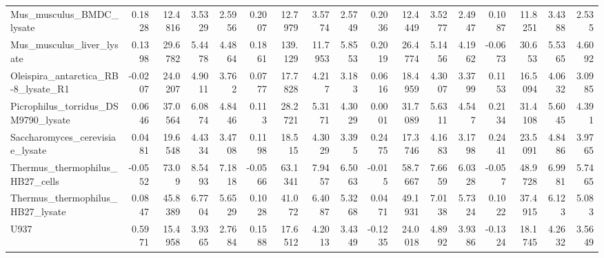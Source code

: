 \begin{tabular}{lrrrrrrrrrrrrrrrr}
 Mus\_musculus\_BMDC\_lysate                    &               0.1828  &          12.4816 &           3.5329  &          2.5956  &         0.2007   &     12.7979 &      3.5774  &     2.5749  &       0.2036   &   12.4449 &     3.5277 &   2.4947  &         0.1087   &     11.8251 &       3.4388 &     2.535   \\
 Mus\_musculus\_liver\_lysate                   &               0.1398  &          29.6782 &           5.4478  &          4.4864  &         0.1861   &    139.129  &     11.7953  &     5.8553  &       0.2019   &   26.4774 &     5.1456 &   4.1962  &        -0.0673   &     30.653  &       5.5365 &     4.6092  \\
 Oleispira\_antarctica\_RB-8\_lysate\_R1         &              -0.0207  &          24.0207 &           4.9011  &          3.762   &         0.0777   &     17.7828 &      4.217   &     3.183   &       0.0616   &   18.4959 &     4.3007 &   3.3799  &         0.1153   &     16.5094 &       4.0632 &     3.0985  \\
 Picrophilus\_torridus\_DSM9790\_lysate         &               0.0646  &          37.0564 &           6.0874  &          4.8446  &         0.113    &     28.2721 &      5.3171  &     4.3029  &       0.0001   &   31.7089 &     5.6311 &   4.547   &         0.2134   &     31.4108 &       5.6045 &     4.391   \\
 Saccharomyces\_cerevisiae\_lysate             &               0.0481  &          19.6548 &           4.4334  &          3.4708  &         0.1198   &     18.515  &      4.3029  &     3.395   &       0.2475   &   17.3746 &     4.1683 &   3.1798  &         0.2441   &     23.5091 &       4.8486 &     3.9765  \\
 Thermus\_thermophilus\_HB27\_cells             &              -0.0552  &          73.09   &           8.5493  &          7.1818  &        -0.0566   &     63.1341 &      7.9457  &     6.5063  &      -0.015    &   58.7667 &     7.6659 &   6.0328  &        -0.057    &     48.9728 &       6.9981 &     5.7465  \\
 Thermus\_thermophilus\_HB27\_lysate            &               0.0847  &          45.8389 &           6.7704  &          5.6529  &         0.1028   &     41.072  &      6.4087  &     5.3268  &       0.0471   &   49.1931 &     7.0138 &   5.7324  &         0.1022   &     37.4915 &       6.123  &     5.083   \\
 U937                                        &               0.5971  &          15.4958 &           3.9365  &          2.7684  &         0.1588   &     17.6512 &      4.2013  &     3.4349  &      -0.1235   &   24.0018 &     4.8992 &   3.9386  &        -0.1324   &     18.1745 &       4.2632 &     3.5649  \\

\end{tabular}
